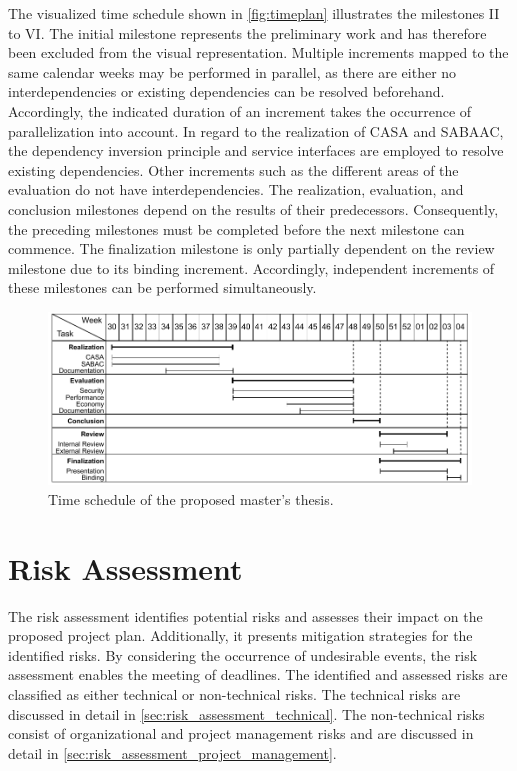 The visualized time schedule shown in \autoref{fig:timeplan} illustrates the milestones II to VI.
The initial milestone represents the preliminary work and has therefore been excluded from the visual representation.
Multiple increments mapped to the same calendar weeks may be performed in parallel, as there are either no interdependencies or existing dependencies can be resolved beforehand.
Accordingly, the indicated duration of an increment takes the occurrence of parallelization into account.
In regard to the realization of CASA and SABAAC, the dependency inversion principle and service interfaces are employed to resolve existing dependencies.
Other increments such as the different areas of the evaluation do not have interdependencies.
The realization, evaluation, and conclusion milestones depend on the results of their predecessors.
Consequently, the preceding milestones must be completed before the next milestone can commence.
The finalization milestone is only partially dependent on the review milestone due to its binding increment.
Accordingly, independent increments of these milestones can be performed simultaneously.
\begin{figure}
    \centering
    \includegraphics[width=1.0\linewidth]{figures/timeplan.drawio.pdf}
    \caption{Time schedule of the proposed master's thesis.}
    \label{fig:timeplan}
\end{figure}

\section{Risk Assessment}
\label{sec:risk_assessment}
The risk assessment identifies potential risks and assesses their impact on the proposed project plan.
Additionally, it presents mitigation strategies for the identified risks.
By considering the occurrence of undesirable events, the risk assessment enables the meeting of deadlines.
The identified and assessed risks are classified as either technical or non-technical risks.
The technical risks are discussed in detail in \autoref{sec:risk_assessment_technical}.
The non-technical risks consist of organizational and project management risks and are discussed in detail in \autoref{sec:risk_assessment_project_management}.

